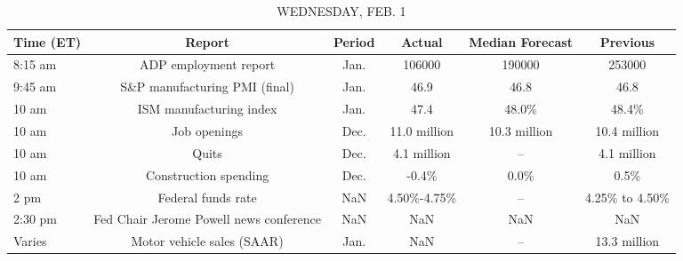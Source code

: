 \documentclass{article}%
\begin{document}
\begin{table}[htbp]%
\caption{WEDNESDAY, FEB. 1}%
\centering%
\begin{adjustbox}{width=1\textwidth}%
\begin{tabular}{lccccc}
\toprule
Time (ET) &                                  Report & Period &       Actual & Median Forecast &       Previous \\
\midrule
  8:15 am &                   ADP employment report &   Jan. &       106000 &          190000 &         253000 \\
  9:45 am &           S\&P manufacturing PMI (final) &   Jan. &         46.9 &            46.8 &           46.8 \\
    10 am &                 ISM manufacturing index &   Jan. &         47.4 &           48.0\% &          48.4\% \\
    10 am &                            Job openings &   Dec. & 11.0 million &    10.3 million &   10.4 million \\
    10 am &                                   Quits &   Dec. &  4.1 million &              -- &    4.1 million \\
    10 am &                   Construction spending &   Dec. &        -0.4\% &            0.0\% &           0.5\% \\
     2 pm &                      Federal funds rate &    NaN &  4.50\%-4.75\% &              -- & 4.25\% to 4.50\% \\
  2:30 pm & Fed Chair Jerome Powell news conference &    NaN &          NaN &             NaN &            NaN \\
   Varies &              Motor vehicle sales (SAAR) &   Jan. &          NaN &              -- &   13.3 million \\
\bottomrule
\end{tabular}
%
\end{adjustbox}%
\end{table}

%
\end{document}
